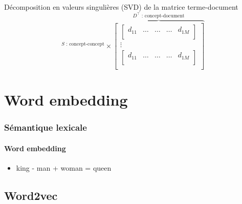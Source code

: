\documentclass[xcolor=table]{beamer}
\begin{document}
\begin{frame}
\begin{block}{Décomposition en valeurs singulières (SVD) de la matrice terme-document}
\[{		}^{S \text{ : concept-concept}}
		\times 
		\overbrace{
			\begin{bmatrix}
			\begin{bmatrix}
			d_{11} & \ldots & \ldots & \ldots & d_{1M} \\
			\end{bmatrix}\\
			\vdots \\
			\begin{bmatrix}
			d_{11} & \ldots & \ldots & \ldots & d_{1M} \\
			\end{bmatrix}\\
			\end{bmatrix}
		}^{D^\top \text{ : concept-document}}
		\]
		
	\end{block}
	
\end{frame}


\section{Word embedding}

\begin{frame}
\frametitle{Sémantique lexicale}
\framesubtitle{Word embedding}

\begin{itemize}
	\item king - man + woman = queen
\end{itemize}

\end{frame}


\subsection{Word2vec}
\end{document}
